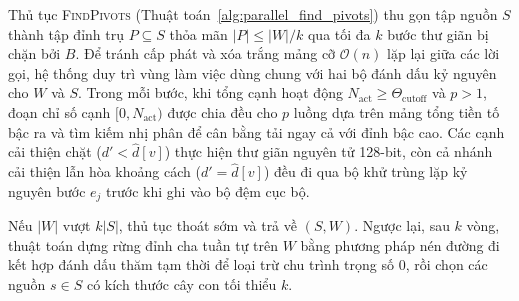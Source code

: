 Thủ tục \textsc{FindPivots} (Thuật toán~\ref{alg:parallel_find_pivots}) thu gọn tập nguồn $S$ thành tập đỉnh trụ $P \subseteq S$ thỏa mãn $|P| \le |W|/k$ qua tối đa $k$ bước thư giãn bị chặn bởi $B$. Để tránh cấp phát và xóa trắng mảng cỡ $\mathcal{O}(n)$ lặp lại giữa các lời gọi, hệ thống duy trì vùng làm việc dùng chung với hai bộ đánh dấu kỷ nguyên cho $W$ và $S$. Trong mỗi bước, khi tổng cạnh hoạt động $N_{\mathrm{act}} \ge \Theta_{\mathrm{cutoff}}$ và $p > 1$, đoạn chỉ số cạnh $[0, N_{\mathrm{act}})$ được chia đều cho $p$ luồng dựa trên mảng tổng tiền tố bậc ra và tìm kiếm nhị phân để cân bằng tải ngay cả với đỉnh bậc cao. Các cạnh cải thiện chặt ($d' < \widehat{d}[v]$) thực hiện thư giãn nguyên tử 128-bit, còn cả nhánh cải thiện lẫn hòa khoảng cách ($d' = \widehat{d}[v]$) đều đi qua bộ khử trùng lặp kỷ nguyên bước $e_j$ trước khi ghi vào bộ đệm cục bộ.

Nếu $|W|$ vượt $k|S|$, thủ tục thoát sớm và trả về $(S, W)$. Ngược lại, sau $k$ vòng, thuật toán dựng rừng đỉnh cha tuần tự trên $W$ bằng phương pháp nén đường đi kết hợp đánh dấu thăm tạm thời để loại trừ chu trình trọng số $0$, rồi chọn các nguồn $s \in S$ có kích thước cây con tối thiểu $k$.

